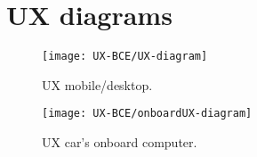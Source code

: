 \section{UX diagrams}

\begin{figure}[H]
	\centering
	\texttt{[image: UX-BCE/UX-diagram]}
	\caption[Mobile App/Desktop UX Diagram]{UX mobile/desktop.}
	\label{fig:UX-diagram}
\end{figure}

\begin{figure}[H]
	\centering
	\texttt{[image: UX-BCE/onboardUX-diagram]}
	\caption[Onboard Computer UX Diagram]{UX car's onboard computer.}
	\label{fig:onboardUX-diagram}
\end{figure}